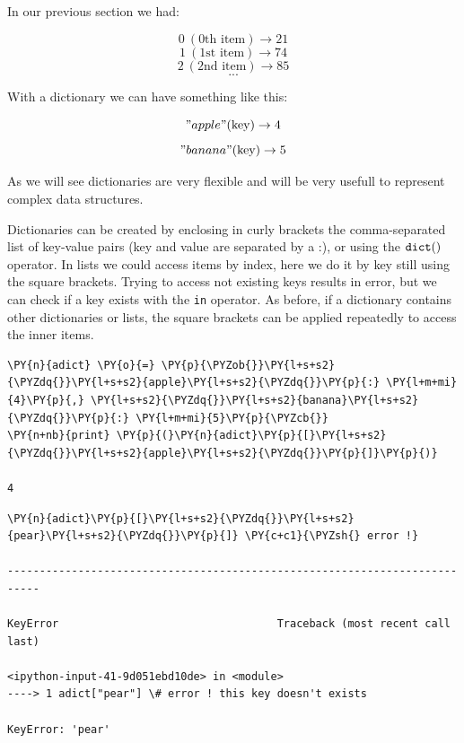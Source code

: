 In our previous section we had:

\[ 0~(\textrm{0th item}) \rightarrow 21\]
\[ 1~(\textrm{1st item}) \rightarrow 74\]
\[ 2~(\textrm{2nd item}) \rightarrow 85\] \[ ... \]

With a dictionary we can have something like this:

\["apple" (\textrm{key}) \rightarrow 4 \]
\["banana" (\textrm{key}) \rightarrow 5 \]

As we will see dictionaries are very flexible and will be very usefull to represent complex data structures.

Dictionaries can be created by enclosing in curly brackets the comma-separated list of key-value pairs (key and value are separated by a :), or using the $\tt{dict()}$ operator.
In lists we could access items by index, here we do it by key still using the square brackets. Trying to access not existing keys results in error, but we can check if a key exists with the \texttt{in} operator.
As before, if a dictionary contains other dictionaries or lists, the square brackets can be applied repeatedly to access the inner items.

\begin{tcolorbox}[breakable, size=fbox, boxrule=1pt, pad at break*=1mm, colback=cellbackground, colframe=cellborder]
\begin{Verbatim}[commandchars=\\\{\}]
\PY{n}{adict} \PY{o}{=} \PY{p}{\PYZob{}}\PY{l+s+s2}{\PYZdq{}}\PY{l+s+s2}{apple}\PY{l+s+s2}{\PYZdq{}}\PY{p}{:} \PY{l+m+mi}{4}\PY{p}{,} \PY{l+s+s2}{\PYZdq{}}\PY{l+s+s2}{banana}\PY{l+s+s2}{\PYZdq{}}\PY{p}{:} \PY{l+m+mi}{5}\PY{p}{\PYZcb{}}
\PY{n+nb}{print} \PY{p}{(}\PY{n}{adict}\PY{p}{[}\PY{l+s+s2}{\PYZdq{}}\PY{l+s+s2}{apple}\PY{l+s+s2}{\PYZdq{}}\PY{p}{]}\PY{p}{)}

4
\end{Verbatim}
\end{tcolorbox}

\begin{tcolorbox}[breakable, size=fbox, boxrule=1pt, pad at break*=1mm, colback=cellbackground, colframe=cellborder]
\begin{Verbatim}[commandchars=\\\{\}]
\PY{n}{adict}\PY{p}{[}\PY{l+s+s2}{\PYZdq{}}\PY{l+s+s2}{pear}\PY{l+s+s2}{\PYZdq{}}\PY{p}{]} \PY{c+c1}{\PYZsh{} error !}

---------------------------------------------------------------------------

KeyError                                  Traceback (most recent call last)

<ipython-input-41-9d051ebd10de> in <module>
----> 1 adict["pear"] \# error ! this key doesn't exists
    
KeyError: 'pear'
\end{Verbatim}
\end{tcolorbox}

